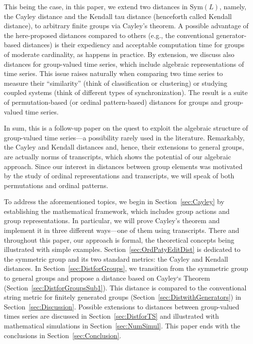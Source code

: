 \documentclass{article}
\begin{document}
This being the case, in this paper, we extend two distances in $\mathrm{Sym}%
(L)$, namely, the Cayley distance and the Kendall tau distance (henceforth
called Kendall distance), to arbitrary finite groups via Cayley's theorem. A
possible advantage of the here-proposed distances compared to others (e.g.,
the conventional generator-based distances) is their expediency and
acceptable computation time for groups of moderate cardinality, as happens
in practice. By extension, we discuss also distances for group-valued time
series, which include algebraic representations of time series. This issue
raises naturally when comparing two time series to measure their
``similarity'' (think of classification or
clustering) or studying coupled systems (think of different types of
synchronization). The result is a suite of permutation-based (or ordinal
pattern-based) distances for groups and group-valued time series.

In sum, this is a follow-up paper on the quest to exploit the algebraic
structure of group-valued time series---a possibility rarely used in the
literature. Remarkably, the Cayley and Kendall distances and, hence, their
extensions to general groups, are actually norms of transcripts, which shows
the potential of our algebraic approach. Since our interest in distances
between group elements was motivated by the study of ordinal representations
and transcripts, we will speak of both permutations and ordinal patterns.

To address the aforementioned topics, we begin in Section~\ref{sec:Cayley}
by establishing the mathematical framework, which includes group actions and
group representations. In particular, we will prove Cayley's theorem and
implement it in three different ways---one of them using transcripts. There
and throughout this paper, our approach is formal, the theoretical concepts
being illustrated with simple examples. Section~\ref{sec:OrdPatyEditDist} is
dedicated to the symmetric group and its two standard metrics: the Cayley
and Kendall distances. In Section~\ref{sec:DistforGroups}, we transition from
the symmetric group to general groups and propose a distance based on
Cayley`s Theorem (Section~\ref{sec:DistforGroupsSub1}). This distance is
compared to the conventional string metric for finitely generated groups
(Section~\ref{sec:DistwithGenerators}) in Section~\ref{sec:Discussion}.
Possible extensions to distances between group-valued times series are
discussed in Section~\ref{sec:DistforTS} and illustrated with mathematical
simulations in Section~\ref{sec:NumSimul}. This paper ends with the
conclusions in Section~\ref{sec:Conclusion}.
\end{document}
